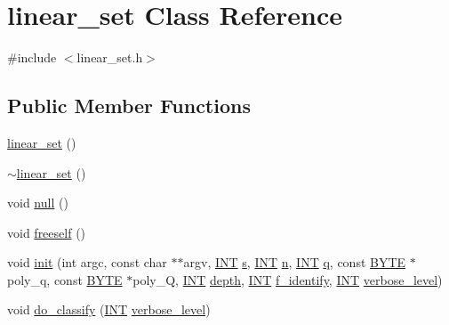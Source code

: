 \hypertarget{classlinear__set}{}\section{linear\+\_\+set Class Reference}
\label{classlinear__set}


{\ttfamily \#include $<$linear\+\_\+set.\+h$>$}

\subsection*{Public Member Functions}
\begin{DoxyCompactItemize}
\item 
\mbox{\hyperlink{classlinear__set_a7f49da8b10dd00d8397a2183f6e014f6}{linear\+\_\+set}} ()
\item 
\mbox{\hyperlink{classlinear__set_ac49533efb6f4087e4078f9de5aa2a637}{$\sim$linear\+\_\+set}} ()
\item 
void \mbox{\hyperlink{classlinear__set_a0160629023f36662ae49a15a66e3ae71}{null}} ()
\item 
void \mbox{\hyperlink{classlinear__set_ae806af3cc0c8b5cd2a7d56937ed13229}{freeself}} ()
\item 
void \mbox{\hyperlink{classlinear__set_a7ab24e84423749047d5465cb15505475}{init}} (int argc, const char $\ast$$\ast$argv, \mbox{\hyperlink{galois_8h_a09fddde158a3a20bd2dcadb609de11dc}{I\+NT}} \mbox{\hyperlink{classlinear__set_ad4d01b16d3679869de7a1bb98f850cd2}{s}}, \mbox{\hyperlink{galois_8h_a09fddde158a3a20bd2dcadb609de11dc}{I\+NT}} \mbox{\hyperlink{classlinear__set_a2208a5df88b4ffcfb819c54cd1366f98}{n}}, \mbox{\hyperlink{galois_8h_a09fddde158a3a20bd2dcadb609de11dc}{I\+NT}} \mbox{\hyperlink{classlinear__set_a008a519d19ff8418e62c906f3fce1d42}{q}}, const \mbox{\hyperlink{galois_8h_ab6cc7b4aeb6ea31aba2b3fbfc83ff5e6}{B\+Y\+TE}} $\ast$poly\+\_\+q, const \mbox{\hyperlink{galois_8h_ab6cc7b4aeb6ea31aba2b3fbfc83ff5e6}{B\+Y\+TE}} $\ast$poly\+\_\+Q, \mbox{\hyperlink{galois_8h_a09fddde158a3a20bd2dcadb609de11dc}{I\+NT}} \mbox{\hyperlink{classlinear__set_ac458047edb453e716e6a936aac1afef6}{depth}}, \mbox{\hyperlink{galois_8h_a09fddde158a3a20bd2dcadb609de11dc}{I\+NT}} \mbox{\hyperlink{classlinear__set_a65c64b321930475bc895c49a9c0936a7}{f\+\_\+identify}}, \mbox{\hyperlink{galois_8h_a09fddde158a3a20bd2dcadb609de11dc}{I\+NT}} \mbox{\hyperlink{simeon_8_c_a818073fbcc2f439e7c56952f67386122}{verbose\+\_\+level}})
\item 
void \mbox{\hyperlink{classlinear__set_a3eb2dbce7fa8b71901dfc12f288ddd0c}{do\+\_\+classify}} (\mbox{\hyperlink{galois_8h_a09fddde158a3a20bd2dcadb609de11dc}{I\+NT}} \mbox{\hyperlink{simeon_8_c_a818073fbcc2f439e7c56952f67386122}{verbose\+\_\+level}})
$$
\end{DoxyCompactItemize}
